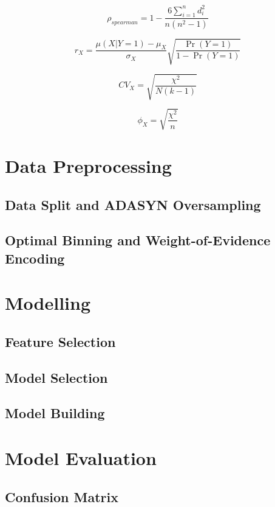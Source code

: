 \begin{equation}\label{eq}
	\rho_{spearman} = 1 - \frac{6 \sum_{i=1}^{n} d_{i}^{2}}{n \left(n^{2}-1\right)}
	\end{equation}

\begin{equation}\label{eq}
	r_{X} = \frac{\mu \left( X | Y=1 \right) -\mu_{X}}{\sigma_{X}} \sqrt{\frac{\Pr \left(Y=1\right)}{1-\Pr \left(Y=1\right)}}
	\end{equation}

\begin{equation}\label{eq}
		CV_{X} = \sqrt{\frac{\chi^{2}}{N\left(k-1\right)}}
		\end{equation}

		\begin{equation}\label{eq}
			\phi_{X} = \sqrt{\frac{\chi^{2}}{n}}
			\end{equation}
\section{Data Preprocessing}
\subsection{Data Split and ADASYN Oversampling}
\subsection{Optimal Binning and Weight-of-Evidence Encoding}
\section{Modelling}
\subsection{Feature Selection}
\subsection{Model Selection}
\subsection{Model Building}
\section{Model Evaluation}
\subsection{Confusion Matrix}
